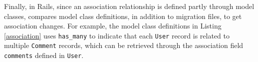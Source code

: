 
Finally, in Rails, since an association relationship
is defined 
partly through 
model classes, \Tool compares model class definitions, in addition to migration files, to get association changes. For example, the model class definitions in Listing \ref{association}
uses \texttt{has\_many} to indicate that each \texttt{User} record
is related to multiple \texttt{Comment} records, which can be retrieved through the association field \texttt{comments} defined in  \texttt{User}.

 
